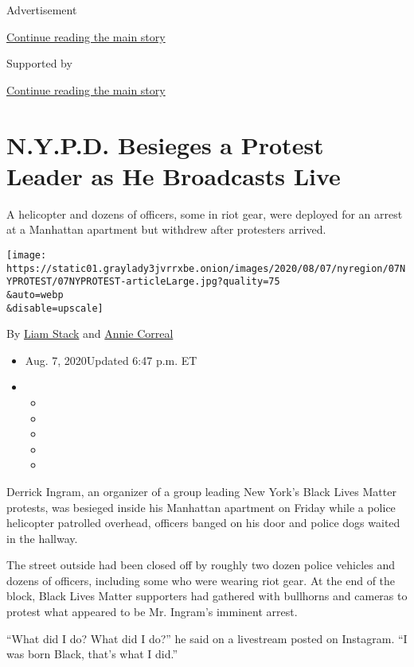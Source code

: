 Advertisement

\protect\hyperlink{after-top}{Continue reading the main story}

Supported by

\protect\hyperlink{after-sponsor}{Continue reading the main story}

\hypertarget{nypd-besieges-a-protest-leader-as-he-broadcasts-live}{%
\section{N.Y.P.D. Besieges a Protest Leader as He Broadcasts
Live}\label{nypd-besieges-a-protest-leader-as-he-broadcasts-live}}

A helicopter and dozens of officers, some in riot gear, were deployed
for an arrest at a Manhattan apartment but withdrew after protesters
arrived.

\texttt{[image: https://static01.graylady3jvrrxbe.onion/images/2020/08/07/nyregion/07NYPROTEST/07NYPROTEST-articleLarge.jpg?quality=75\\\&auto=webp\\\&disable=upscale]}

By \href{https://www.nytimes3xbfgragh.onion/by/liam-stack}{Liam Stack}
and \href{https://www.nytimes3xbfgragh.onion/by/annie-correal}{Annie
Correal}

\begin{itemize}
\item
  Aug. 7, 2020Updated 6:47 p.m. ET
\item
  \begin{itemize}
  \item
  \item
  \item
  \item
  \item
  \end{itemize}
\end{itemize}

Derrick Ingram, an organizer of a group leading New York's Black Lives
Matter protests, was besieged inside his Manhattan apartment on Friday
while a police helicopter patrolled overhead, officers banged on his
door and police dogs waited in the hallway.

The street outside had been closed off by roughly two dozen police
vehicles and dozens of officers, including some who were wearing riot
gear. At the end of the block, Black Lives Matter supporters had
gathered with bullhorns and cameras to protest what appeared to be Mr.
Ingram's imminent arrest.

``What did I do? What did I do?'' he said on a livestream posted on
Instagram. ``I was born Black, that's what I did.''

